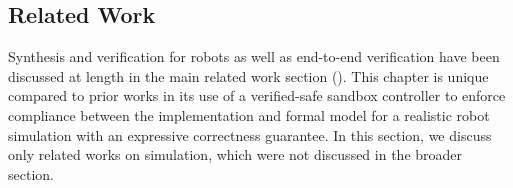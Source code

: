 \documentclass[12pt]{cmuthesis}
\theoremstyle{definition}
\theoremstyle{remark}
\newcommand{\rref}[2][]{\prettyref{#2}}
\newcommand{\VeriPhy}{VeriPhy\xspace}
\begin{document}


\subsection{Related Work}
Synthesis and verification for robots as well as end-to-end verification have been discussed at length in the main related work section (\rref{sec:relwork}).
This chapter is unique compared to prior works in its use of a verified-safe sandbox controller to enforce compliance between the implementation and formal model for a realistic robot simulation with an expressive correctness guarantee.
In this section, we discuss only related works on simulation, which were not discussed in the broader section.
\end{document}
